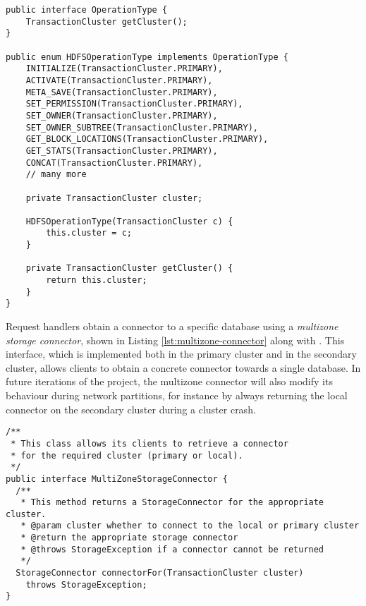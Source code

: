 \begin{lstlisting}[label={lst:optype-enum}, caption={The OperationType enum}]
public interface OperationType {
    TransactionCluster getCluster();
} 

public enum HDFSOperationType implements OperationType {
    INITIALIZE(TransactionCluster.PRIMARY),
    ACTIVATE(TransactionCluster.PRIMARY),
    META_SAVE(TransactionCluster.PRIMARY),
    SET_PERMISSION(TransactionCluster.PRIMARY),
    SET_OWNER(TransactionCluster.PRIMARY),
    SET_OWNER_SUBTREE(TransactionCluster.PRIMARY),
    GET_BLOCK_LOCATIONS(TransactionCluster.PRIMARY),
    GET_STATS(TransactionCluster.PRIMARY),
    CONCAT(TransactionCluster.PRIMARY),
    // many more

    private TransactionCluster cluster;

    HDFSOperationType(TransactionCluster c) {
        this.cluster = c;
    }

    private TransactionCluster getCluster() {
        return this.cluster;
    }
}
\end{lstlisting}

Request handlers obtain a connector to a specific database using a \emph{multizone storage connector}, shown in Listing \ref{lst:multizone-connector} along with .
This interface, which is implemented both in the primary cluster and in the secondary cluster, allows clients to obtain a concrete connector towards a single database.
In future iterations of the project, the multizone connector will also modify its behaviour during network partitions, for instance by always returning the local connector on the secondary cluster during a cluster crash.
\begin{lstlisting}[label={lst:multizone-connector}, caption={The MultiZoneStorageConnector interface}]
/**
 * This class allows its clients to retrieve a connector 
 * for the required cluster (primary or local).
 */
public interface MultiZoneStorageConnector {
  /**
   * This method returns a StorageConnector for the appropriate cluster.
   * @param cluster whether to connect to the local or primary cluster
   * @return the appropriate storage connector
   * @throws StorageException if a connector cannot be returned
   */
  StorageConnector connectorFor(TransactionCluster cluster)
    throws StorageException;
}
\end{lstlisting}


